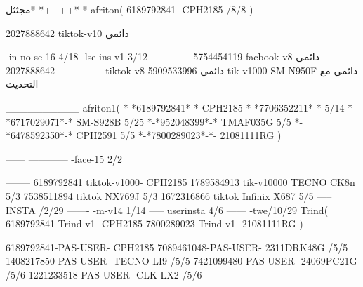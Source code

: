 مجثثل*-*++++*-*
afriton(
6189792841- CPH2185  /8/8
)

2027888642 tiktok-v10
دائمي

-in-no-se-16 4/18
-lse-ins-v1 3/12
------------
5754454119 facbook-v8
دائمي
--------------
2027888642 tiktok-v8
دائمي
5909533996 tik-v1000  SM-N950F
دائمي مع التحديث

__________
afriton1(
*-*6189792841*-*-CPH2185
*-*7706352211*-* 5/14
*-*6717029071*-*  SM-S928B 5/25
*-*952048399*-* TMAF035G 5/5
*-*6478592350*-* CPH2591 5/5
*-*7800289023*-*- 21081111RG \5\7
)


------
------------
-face-15 2/2

--------
6189792841 tiktok-v1000- CPH2185 
1789584913 tik-v10000  TECNO CK8n 5/3
7538511894 tiktok NX769J  5/3
1672316866 tiktok Infinix X687  5/5
-----
 INSTA /2/29
-------
-m-v14 1/14
-----
userinsta 4/6
------
-twe/10/29
Trind(
6189792841-Trind-v1- CPH2185 
7800289023-Trind-v1- 21081111RG \5\5
)

6189792841-PAS-USER- CPH2185 
7089461048-PAS-USER- 2311DRK48G /5/5
1408217850-PAS-USER- TECNO LI9 /5/5
7421099480-PAS-USER- 24069PC21G /5/6
1221233518-PAS-USER- CLK-LX2 /5/6
    ---------------

